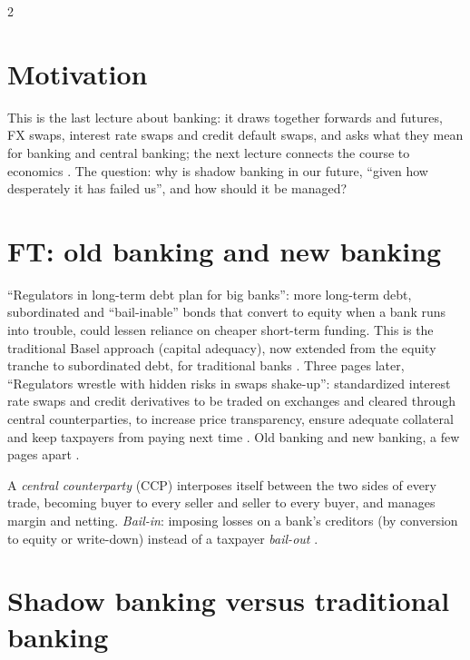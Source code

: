 \begin{paracol}{2}
\section*{Motivation}
This is the last lecture about banking: it draws together forwards and futures, FX swaps, interest rate swaps and credit default swaps, and asks what they mean for
banking and central banking; the next lecture connects the course to economics . The question: why is shadow banking
in our future, ``given how desperately it has failed us'', and how should it be managed? 

\section{FT: old banking and new banking}\label{sec:cbs-ft}

\begin{casestudy}
``Regulators in long-term debt plan for big banks'': more long-term debt, subordinated and ``bail-inable'' bonds that convert to equity when a bank runs into
trouble, could lessen reliance on cheaper short-term funding. This is the traditional Basel approach (capital adequacy), now extended from the equity tranche to
subordinated debt, for traditional banks . Three pages later, ``Regulators wrestle
with hidden risks in swaps shake-up'': standardized interest rate swaps and credit derivatives to be traded on exchanges and cleared through central
counterparties, to increase price transparency, ensure adequate collateral and keep taxpayers from paying next time .
Old banking and new banking, a few pages apart .
\end{casestudy}

\begin{definition}
A \emph{central counterparty} (CCP) interposes itself between the two sides of every trade, becoming buyer to every seller and seller to every buyer, and manages
margin and netting. \emph{Bail-in}: imposing losses on a bank's creditors (by conversion to equity or write-down) instead of a taxpayer \emph{bail-out}
.
\end{definition}

\section{Shadow banking versus traditional banking}\label{sec:cbs-vs}


\end{paracol}
